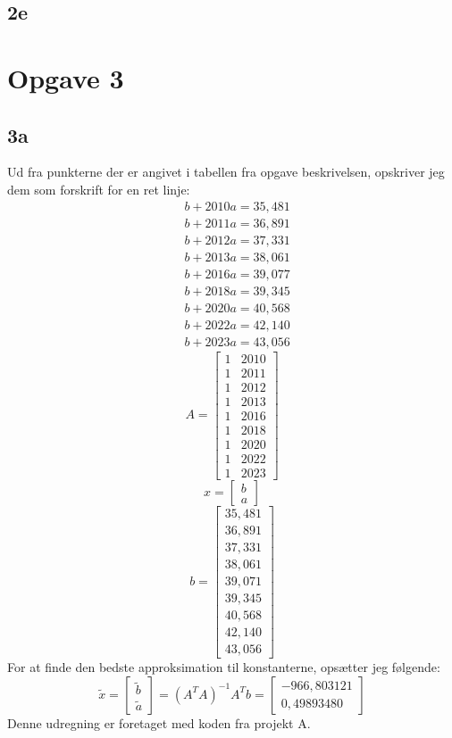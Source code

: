 \documentclass{article}
\begin{document}
\subsection*{2e}

\section*{Opgave 3}
\subsection*{3a}
Ud fra punkterne der er angivet i tabellen fra opgave beskrivelsen, opskriver jeg dem som forskrift for en ret linje:
$$
\begin{aligned}
& b+2010 a=35,481 \\
& b+2011 a=36,891 \\
& b+2012 a=37,331 \\
& b+2013 a=38,061 \\
& b+2016 a=39,077 \\
& b+2018 a=39,345 \\
& b+2020 a=40,568 \\
& b+2022 a=42,140 \\
& b+2023 a=43,056
\end{aligned}
$$
$$
A=\left[\begin{array}{ll}
1 & 2010 \\
1 & 2011 \\
1 & 2012 \\
1 & 2013 \\
1 & 2016 \\
1 & 2018 \\
1 & 2020 \\
1 & 2022 \\
1 & 2023
\end{array}\right]
$$
$$
x=\left[\begin{array}{l}
b \\
a
\end{array}\right]
$$
$$
b=\left[\begin{array}{l}
35,481 \\
36,891 \\
37,331 \\
38,061 \\
39,071 \\
39,345 \\
40,568 \\
42,140 \\
43,056
\end{array}\right]
$$
For at finde den bedste approksimation til konstanterne, opsætter jeg følgende:
$$
\tilde{x}=\left[\begin{array}{c}
\tilde{b} \\
\tilde{a}
\end{array}\right]=\left(A^T A\right)^{-1} A^T b=
\left[\begin{array}{c}
-966,803121 \\
0,49893480
\end{array}\right]
$$
Denne udregning er foretaget med koden fra projekt A.
\end{document}
